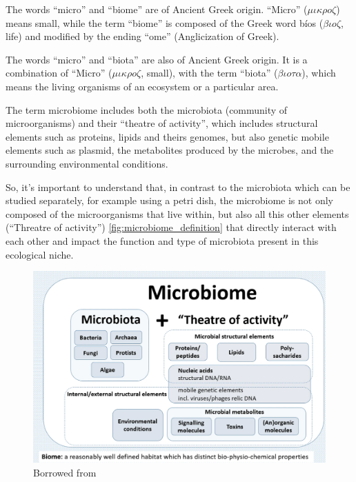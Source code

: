 \begin{definition}[Microbiome]
    The words “micro” and “biome” are of Ancient Greek origin. “Micro” ($\mu\iota\kappa\rho o\zeta$) means small, while 
    the term “biome” is composed of the Greek word bíos ($\beta\iota o \zeta$, life) and modified by the ending “ome” (Anglicization of Greek).
\end{definition}
\begin{definition}[Microbiota]
    The words “micro” and “biota” are also of Ancient Greek origin. It is a combination of “Micro” ($\mu\iota\kappa\rho o \zeta$, small), with 
    the term “biota” ($\beta\iota o \tau\alpha$), which means the living organisms of an ecosystem or a particular area.
\end{definition}
\begin{definition}[Microbiome]
    The term microbiome includes both the microbiota (community of microorganisms) and their “theatre of activity”, 
    which includes structural elements such as proteins, lipids and theirs genomes, but also genetic mobile elements such 
    as plasmid, the metabolites produced by the microbes, and the surrounding environmental conditions.
\end{definition}
So, it's important to understand that, in contrast to the microbiota which can be studied separately, for example using a 
petri dish, the microbiome is not only composed of the microorganisms that live within, but also all this other elements 
(“Threatre of activity”) \autoref{fig:microbiome_definition} that directly interact with each other and impact the function 
and type of microbiota present in this ecological niche.

\begin{figure}[!ht]
    \centering
    \includegraphics[width=1\linewidth]{./figure/microbiome_definition.png}
    \caption{Borrowed from  \cite{Berg2020}}
    \label{fig:microbiome_definition}
\end{figure}

